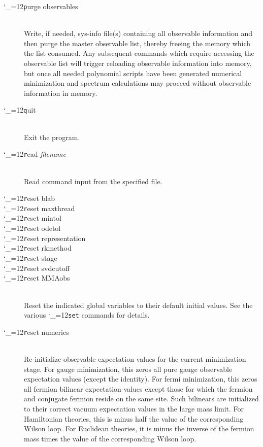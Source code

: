 \documentclass [12pt]{article}
\makeatletter
\renewcommand{\tt}{\begingroup\catcode`_=12\def\_{\string_}\tt@}
\newcommand{\tt@}[1]{\texttt{#1}\endgroup}
\makeatother
\begin{document}
\begin{description}
\item [\tt purge observables]~\\
    Write, if needed, sys-info file(s) containing all observable information
    and then purge the master observable list, thereby freeing the memory
    which the list consumed.
    Any subsequent commands which require accessing the observable list will
    trigger reloading observable information into memory,
    but once all needed polynomial scripts have been generated
    numerical minimization and spectrum calculations may proceed
    without observable information in memory.

\item [\tt quit]~\\
    Exit the program.

\item [\tt read {\it filename}]~\\
    Read command input from the specified file.

\item [\tt reset blab]\bgroup \itemsep 0pt \parskip 0pt
\item [\tt reset maxthread]
\item [\tt reset mintol]
\item [\tt reset odetol]
\item [\tt reset representation]
\item [\tt reset rkmethod]
\item [\tt reset stage]
\item [\tt reset svdcutoff]
\item [\tt reset MMAobs]~\\
    Reset the indicated global variables to their default initial values.
    See the various \tt{set} commands for details.
\egroup

\item [\tt reset numerics]~\\
    Re-initialize observable expectation values
    for the current minimization stage.
    For gauge minimization, this zeros all pure gauge
    observable expectation values (except the identity).
    For fermi minimization, this zeros all fermion
    bilinear expectation values except those for which
    the fermion and conjugate fermion reside on the same
    site.  Such bilinears are initialized to their
    correct vacuum expectation values in the large mass limit.
    For Hamiltonian theories, this is minus half
    the value of the corresponding Wilson loop.
    For Euclidean theories, it is minus the inverse of the fermion mass
    times the value of the corresponding Wilson loop.


\end{description}
\end{document}
